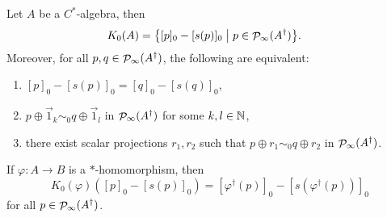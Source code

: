 \begin{proposition} \label{StandardPictureK0}
Let $A$ be a $C^*$-algebra, then
\begin{align*}
K_{0}(A) &= \setbuilder{[p]_0 - [s(p)]_0}{p \in \Projections_\infty(A^\dagger)}.
\end{align*}
Moreover, for all $p,q\in\mathop{\mathcal{P}}\nolimits_\infty(A^\dagger)$, the following are equivalent:
\begin{enumerate}
\item $[p]_0-[s(p)]_0 = [q]_0 - [s(q)]_0$,
\item $p\oplus \vec{1}_k \sim_0 q \oplus \vec{1}_l$ in $\mathop{\mathcal{P}}\nolimits_\infty(A^\dagger)$ for some $k,l\in \mathbb{N}$,
\item there exist scalar projections $r_1, r_2$ such that $p\oplus r_1 \sim_0 q \oplus r_2$ in $\mathop{\mathcal{P}}\nolimits_\infty(A^\dagger)$.
\end{enumerate}
If $\varphi:A\to B$ is a $*$-homomorphism, then
\[ K_0(\varphi)([p]_0 - [s(p)]_0) = [\varphi^\dagger(p)]_0 - [s(\varphi^\dagger(p))]_0 \]
for all $p\in \mathop{\mathcal{P}}\nolimits_\infty(A^\dagger)$.
\end{proposition}
